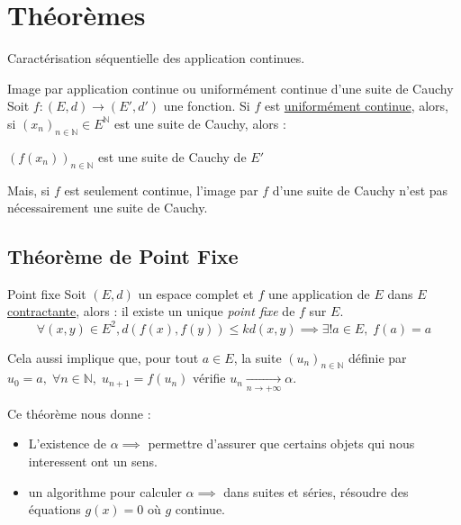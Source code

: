 \section{Théorèmes}

Caractérisation séquentielle des application continues. 

\begin{Prop}{Image par application continue ou uniformément continue d'une suite de Cauchy}{}
  Soit $f : (E,d) \to (E', d')$ une fonction. Si $f$ est \underline{uniformément continue}, alors, si $(x_n)_{n \in \mathbb{N}} \in E ^{ \mathbb{N}}$ est une suite de Cauchy, alors :
\begin{center}
  $(f(x_n))_{n \in \mathbb{N}}$ est une suite de Cauchy de $E'$
\end{center}

Mais, si $f$ est seulement continue, l'image par $f$ d'une suite de Cauchy n'est pas nécessairement une suite de Cauchy.
\end{Prop}

\subsection{Théorème de Point Fixe}
\begin{Theorem}{\color{red} Point fixe}{}
  Soit $(E, d)$ un espace complet et $f$ une application de $E$ dans $E$ \underline{contractante}, alors : 
\center 
il existe un unique \textit{point fixe} de $f$ sur $E$.
\[
  \forall (x, y) \in E ^{2}, d(f(x),f(y)) \le k d(x, y) \implies \exists ! a \in E,\; f(a) =a
\]
\end{Theorem}

Cela aussi implique que, pour tout $a \in E$, la suite $(u_n)_{n\in \mathbb{N}}$ définie par $u_0=a,\; \forall n \in \mathbb{N}, \; u _{n+1} = f(u_n)$ vérifie $u_n\underset{n \to + \infty}{\longrightarrow} \alpha$.

Ce théorème nous donne : 

\begin{itemize}
    \item L'existence de $\alpha \implies$ permettre d'assurer que certains objets qui nous interessent ont un sens.
    \item un algorithme pour calculer $\alpha \implies$ dans suites et séries, résoudre des équations $g(x)=0$ où $g$ continue.
\end{itemize}

